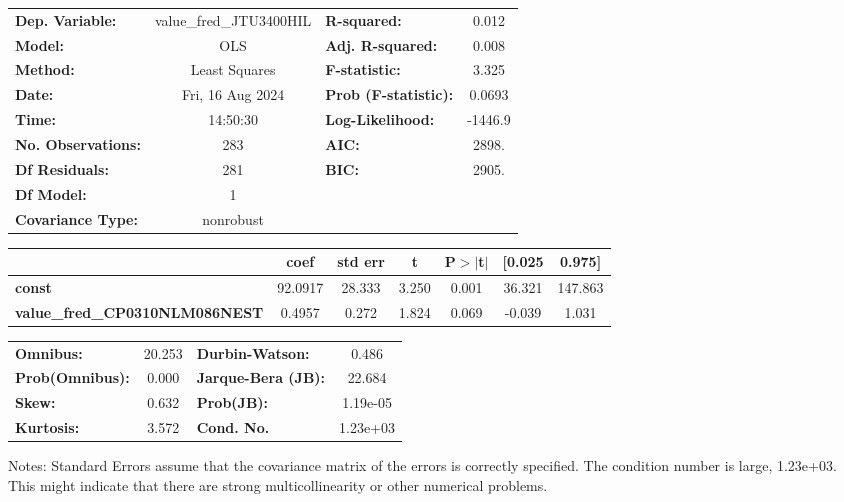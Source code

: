 \begin{center}
\begin{tabular}{lclc}
\toprule
\textbf{Dep. Variable:}                & value\_fred\_JTU3400HIL & \textbf{  R-squared:         } &     0.012   \\
\textbf{Model:}                        &           OLS           & \textbf{  Adj. R-squared:    } &     0.008   \\
\textbf{Method:}                       &      Least Squares      & \textbf{  F-statistic:       } &     3.325   \\
\textbf{Date:}                         &     Fri, 16 Aug 2024    & \textbf{  Prob (F-statistic):} &   0.0693    \\
\textbf{Time:}                         &         14:50:30        & \textbf{  Log-Likelihood:    } &   -1446.9   \\
\textbf{No. Observations:}             &             283         & \textbf{  AIC:               } &     2898.   \\
\textbf{Df Residuals:}                 &             281         & \textbf{  BIC:               } &     2905.   \\
\textbf{Df Model:}                     &               1         & \textbf{                     } &             \\
\textbf{Covariance Type:}              &        nonrobust        & \textbf{                     } &             \\
\bottomrule
\end{tabular}
\begin{tabular}{lcccccc}
                                       & \textbf{coef} & \textbf{std err} & \textbf{t} & \textbf{P$> |$t$|$} & \textbf{[0.025} & \textbf{0.975]}  \\
\midrule
\textbf{const}                         &      92.0917  &       28.333     &     3.250  &         0.001        &       36.321    &      147.863     \\
\textbf{value\_fred\_CP0310NLM086NEST} &       0.4957  &        0.272     &     1.824  &         0.069        &       -0.039    &        1.031     \\
\bottomrule
\end{tabular}
\begin{tabular}{lclc}
\textbf{Omnibus:}       & 20.253 & \textbf{  Durbin-Watson:     } &    0.486  \\
\textbf{Prob(Omnibus):} &  0.000 & \textbf{  Jarque-Bera (JB):  } &   22.684  \\
\textbf{Skew:}          &  0.632 & \textbf{  Prob(JB):          } & 1.19e-05  \\
\textbf{Kurtosis:}      &  3.572 & \textbf{  Cond. No.          } & 1.23e+03  \\
\bottomrule
\end{tabular}
\end{center}

Notes: \newline
 [1] Standard Errors assume that the covariance matrix of the errors is correctly specified. \newline
 [2] The condition number is large, 1.23e+03. This might indicate that there are \newline
 strong multicollinearity or other numerical problems.